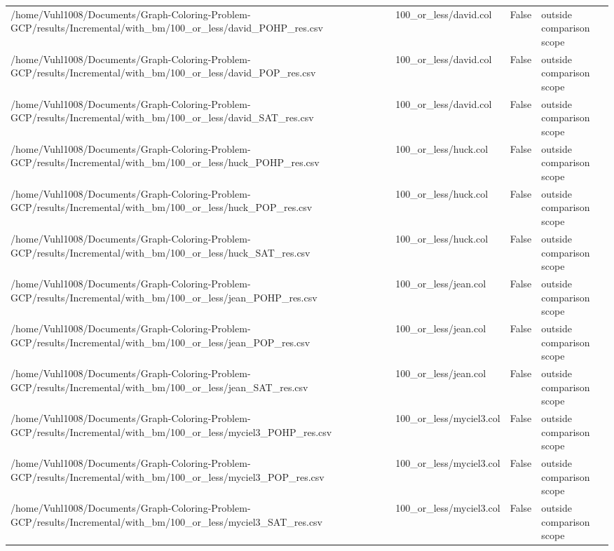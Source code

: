 \begin{table}[htbp]
\begin{tabular}{llll}
/home/Vuhl1008/Documents/Graph-Coloring-Problem-GCP/results/Incremental/with\_bm/100\_or\_less/david\_POHP\_res.csv & 100\_or\_less/david.col & False & outside comparison scope \\
/home/Vuhl1008/Documents/Graph-Coloring-Problem-GCP/results/Incremental/with\_bm/100\_or\_less/david\_POP\_res.csv & 100\_or\_less/david.col & False & outside comparison scope \\
/home/Vuhl1008/Documents/Graph-Coloring-Problem-GCP/results/Incremental/with\_bm/100\_or\_less/david\_SAT\_res.csv & 100\_or\_less/david.col & False & outside comparison scope \\
/home/Vuhl1008/Documents/Graph-Coloring-Problem-GCP/results/Incremental/with\_bm/100\_or\_less/huck\_POHP\_res.csv & 100\_or\_less/huck.col & False & outside comparison scope \\
/home/Vuhl1008/Documents/Graph-Coloring-Problem-GCP/results/Incremental/with\_bm/100\_or\_less/huck\_POP\_res.csv & 100\_or\_less/huck.col & False & outside comparison scope \\
/home/Vuhl1008/Documents/Graph-Coloring-Problem-GCP/results/Incremental/with\_bm/100\_or\_less/huck\_SAT\_res.csv & 100\_or\_less/huck.col & False & outside comparison scope \\
/home/Vuhl1008/Documents/Graph-Coloring-Problem-GCP/results/Incremental/with\_bm/100\_or\_less/jean\_POHP\_res.csv & 100\_or\_less/jean.col & False & outside comparison scope \\
/home/Vuhl1008/Documents/Graph-Coloring-Problem-GCP/results/Incremental/with\_bm/100\_or\_less/jean\_POP\_res.csv & 100\_or\_less/jean.col & False & outside comparison scope \\
/home/Vuhl1008/Documents/Graph-Coloring-Problem-GCP/results/Incremental/with\_bm/100\_or\_less/jean\_SAT\_res.csv & 100\_or\_less/jean.col & False & outside comparison scope \\
/home/Vuhl1008/Documents/Graph-Coloring-Problem-GCP/results/Incremental/with\_bm/100\_or\_less/myciel3\_POHP\_res.csv & 100\_or\_less/myciel3.col & False & outside comparison scope \\
/home/Vuhl1008/Documents/Graph-Coloring-Problem-GCP/results/Incremental/with\_bm/100\_or\_less/myciel3\_POP\_res.csv & 100\_or\_less/myciel3.col & False & outside comparison scope \\
/home/Vuhl1008/Documents/Graph-Coloring-Problem-GCP/results/Incremental/with\_bm/100\_or\_less/myciel3\_SAT\_res.csv & 100\_or\_less/myciel3.col & False & outside comparison scope \\

\end{tabular}
\end{table}
